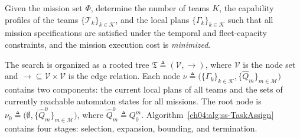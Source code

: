 \begin{problem}
\label{ch04:prob:simultaneous_assignment}
Given the mission set $\Phi$, determine the number of teams $K$, the capability
profiles of the teams $\{\mathcal{T}_k\}_{k\in\mathcal{K}}$, and the local
plans $\{\Gamma_k\}_{k\in\mathcal{K}}$ such that all mission specifications are
satisfied under the temporal and fleet-capacity constraints, and the mission
execution cost is \emph{minimized}.
\end{problem}

The search is organized as a rooted tree
$\mathfrak{T} \triangleq (\mathcal{V},\rightarrow)$,
where $\mathcal{V}$ is the node set and
$\rightarrow \subseteq \mathcal{V}\times\mathcal{V}$ is the edge relation.
Each node
$\nu \triangleq
\bigl(\{\Gamma_k\}_{k\in\mathcal{K}},
\{\widehat{Q}_m\}_{m\in\mathcal{M}}\bigr)$
contains two components: the current local plans of all teams and the sets of
currently reachable automaton states for all missions. The root node is
$\nu_0 \triangleq
\bigl(\emptyset,\{\widehat{Q}_m^0\}_{m\in\mathcal{M}}\bigr)$,
where $\widehat{Q}_m^0 \triangleq Q_0^m$.
 Algorithm~\ref{ch04:alg:ss-TaskAssign}
contains four stages: selection, expansion, bounding, and termination.


